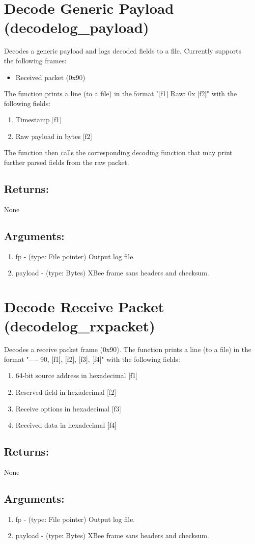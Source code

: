 \section{Decode Generic Payload (decodelog\_payload)}
Decodes a generic payload and logs decoded fields to a file. Currently supports the following frames:
\begin{itemize}
\item Received packet (0x90)
\end{itemize}
The function prints a line (to a file) in the format "[f1] Raw: 0x [f2]" with the following fields:
\begin{enumerate}
\item Timestamp [f1]
\item Raw payload in bytes [f2]
\end{enumerate}
The function then calls the corresponding decoding function that may print further parsed fields from the raw packet.

\subsection{Returns:}
None
\subsection{Arguments:}
\begin{enumerate}
\item fp - (type: File pointer) Output log file.
\item payload - (type: Bytes) XBee frame sans headers and checksum.
\end{enumerate}

\section{Decode Receive Packet (decodelog\_rxpacket)}
Decodes a receive packet frame (0x90). The function prints a line (to a file) in the format "---- 90, [f1], [f2], [f3], [f4]" with the following fields:
\begin{enumerate}
\item 64-bit source address in hexadecimal [f1]
\item Reserved field in hexadecimal [f2]
\item Receive options in hexadecimal [f3]
\item Received data in hexadecimal [f4]
\end{enumerate}
\subsection{Returns:}
None
\subsection{Arguments:}
\begin{enumerate}
\item fp - (type: File pointer) Output log file.
\item payload - (type: Bytes) XBee frame sans headers and checksum.
\end{enumerate}